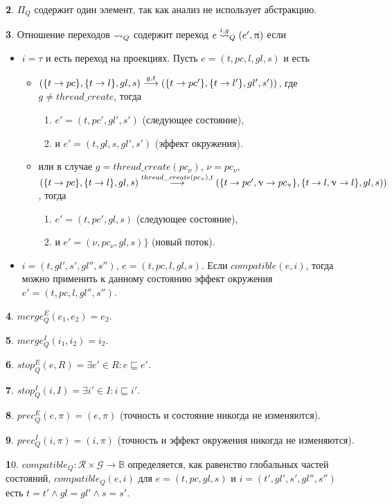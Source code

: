 {\textbf 2.} $\Pi_Q$ содержит один элемент, так как анализ не использует абстракцию.

{\textbf 3.}
Отношение переходов $\leadsto_Q$ содержит переход $e \stackrel{i,g}{\leadsto}_Q (e', \uppi)$ если
\begin{itemize}
\item $i=\tau$ и есть переход на проекциях. Пусть
$e=(t, pc, l, gl, s)$ и есть
\begin{itemize}
\item $(\{t\to pc\}, \{t\to l\}, gl, s) \stackrel{g,t}{\longrightarrow} (\{t\to pc'\}, \{t\to l'\}, gl', s'))$, где $g \ne thread\_create$, тогда \\
\begin{enumerate}
\item $e' = (t,pc',gl',s')$ (следующее состояние), 
\item и $e'=(t,gl,s,gl',s')$ (эффект окружения).
\end{enumerate}
\item или в случае $g=thread\_create(pc_\nu)$, $\nu=pc_\nu$, \\
$(\{t\to pc\}, \{t\to l\}, gl, s) \stackrel{thread\_create(pc_\upnu), t}{\longrightarrow} (\{t\to pc', \upnu \to pc_\upnu\}, \{t\to l,\upnu \to l\}, gl, s))$, тогда \\
\begin{enumerate}
\item $e' = (t,pc',gl,s)$ (следующее состояние),
\item и $e' = (\nu,pc_\nu,gl,s)\}$ (новый поток).
\end{enumerate}
\end{itemize}
\item $i=(t, gl',s',gl'',s'')$, $e=(t, pc, l, gl, s)$. Если $compatible(e,i)$, тогда можно применить к данному состоянию эффект окружения $e'=(t, pc, l, gl'', s'')$.
\end{itemize}

{\textbf 4.}
$merge^E_Q(e_1,e_2) = e_2$.

{\textbf 5.}
$merge^I_Q(i_1,i_2) = i_2$.

{\textbf 6.}
$stop^E_Q(e,R)=\exists e' \in R: e \sqsubseteq e'$.

{\textbf 7.}
$stop^I_Q(i,I)=\exists i' \in I: i \sqsubseteq i'$.

{\textbf 8.}
$prec^E_Q(e,\pi)=(e,\pi)$ (точность и состояние никогда не изменяются).

{\textbf 9.}
$prec^I_Q(i,\pi)=(i,\pi)$ (точность и эффект окружения никогда не изменяются).

{\textbf 10.} 
$compatible_Q: \mathcal{R}\times\mathcal{G} \to \mathbb{B}$ определяется, как равенство глобальных частей состояний, $compatible_Q(e,i)$ для $e=(t,pc,gl,s)$ и $i=(t',gl',s',gl'',s'')$ есть $t=t' \land gl=gl' \land s=s'$.   

